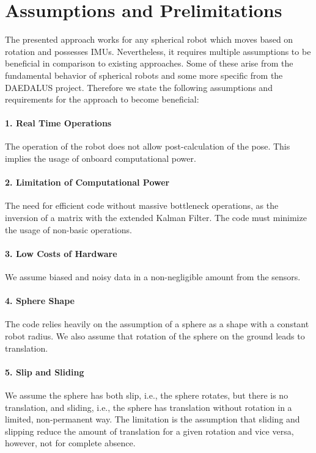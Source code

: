 \documentclass[letterpaper, 10 pt, conference]{ieeeconf}  %
\begin{document}
\section{Assumptions and Prelimitations}
\label{sec:AssumptionsAndPrelimitations}
The presented approach works for any spherical robot which moves based on rotation and possesses IMUs.
Nevertheless, it requires multiple assumptions to be beneficial in comparison to existing approaches.
Some of these arise from the fundamental behavior of spherical robots and some more specific from the DAEDALUS project.
Therefore we state the following assumptions and requirements for the approach to become beneficial:

\paragraph*{1. Real Time Operations}The operation of the robot does not allow post-calculation of the pose. This implies the usage of onboard computational power.
\paragraph*{2. Limitation of Computational Power}
The need for efficient code without massive bottleneck operations, as the inversion of a matrix with the extended Kalman Filter. The code must minimize the usage of non-basic operations.
\paragraph*{3. Low Costs of Hardware}
We assume biased and noisy data in a non-negligible amount from the sensors.
\paragraph*{4. Sphere Shape}
The code relies heavily on the assumption of a sphere as a shape with a constant robot radius. We also assume that rotation of the sphere on the ground leads to translation.
\paragraph*{5. Slip and Sliding}
We assume the sphere has both slip, i.e., the sphere rotates, but there is no translation, and sliding, i.e., the sphere has translation without rotation in a limited, non-permanent way. The limitation is the assumption that sliding and slipping reduce the amount of translation for a given rotation and vice versa, however, not for complete absence.
\end{document}

